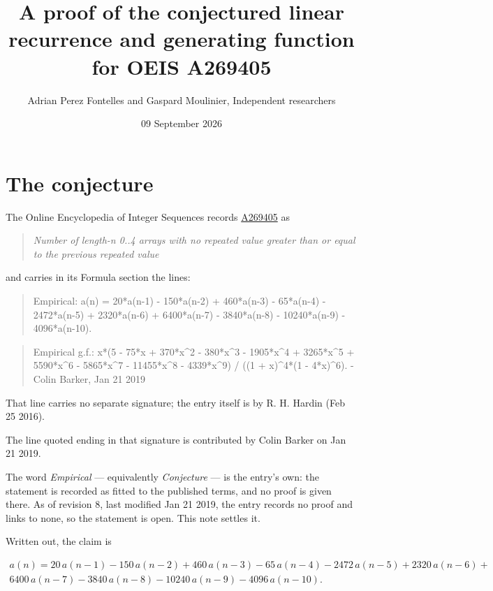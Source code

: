 \documentclass[11pt]{article}
\title{A proof of the conjectured linear recurrence and generating function for OEIS A269405}
\author{Adrian Perez Fontelles and Gaspard Moulinier, Independent researchers}
\date{09 September 2026}
\theoremstyle{definition}
\begin{document}
\maketitle
\section{The conjecture}

The Online Encyclopedia of Integer Sequences records \href{https://oeis.org/A269405}{A269405} as

\begin{quote}\itshape Number of length-n 0..4 arrays with no repeated value greater than or equal to the previous repeated value\end{quote}

and carries in its Formula section the lines:

\begin{quote}\ttfamily Empirical: a(n) = 20*a(n-1) - 150*a(n-2) + 460*a(n-3) - 65*a(n-4) - 2472*a(n-5) + 2320*a(n-6) + 6400*a(n-7) - 3840*a(n-8) - 10240*a(n-9) - 4096*a(n-10).\end{quote}

\begin{quote}\ttfamily Empirical g.f.: x*(5 - 75*x + 370*x\textasciicircum{}2 - 380*x\textasciicircum{}3 - 1905*x\textasciicircum{}4 + 3265*x\textasciicircum{}5 + 5590*x\textasciicircum{}6 - 5865*x\textasciicircum{}7 - 11455*x\textasciicircum{}8 - 4339*x\textasciicircum{}9) / ((1 + x)\textasciicircum{}4*(1 - 4*x)\textasciicircum{}6). - Colin Barker, Jan 21 2019\end{quote}

That line carries no separate signature; the entry itself is by R. H. Hardin (Feb 25 2016).

The line quoted ending in that signature is contributed by Colin Barker on Jan 21 2019.

The word {\itshape Empirical} --- equivalently {\itshape Conjecture} --- is the entry's own: the statement is recorded as fitted to the published terms, and no proof is given there. As of revision 8, last modified Jan 21 2019, the entry records no proof and links to none, so the statement is open. This note settles it.

Written out, the claim is

\begin{multline*} a(n) = 20\,a(n-1) - 150\,a(n-2) + 460\,a(n-3) - 65\,a(n-4) - 2472\,a(n-5) + 2320\,a(n-6) + \\ 6400\,a(n-7) - 3840\,a(n-8) - 10240\,a(n-9) - 4096\,a(n-10). \end{multline*}
\end{document}
